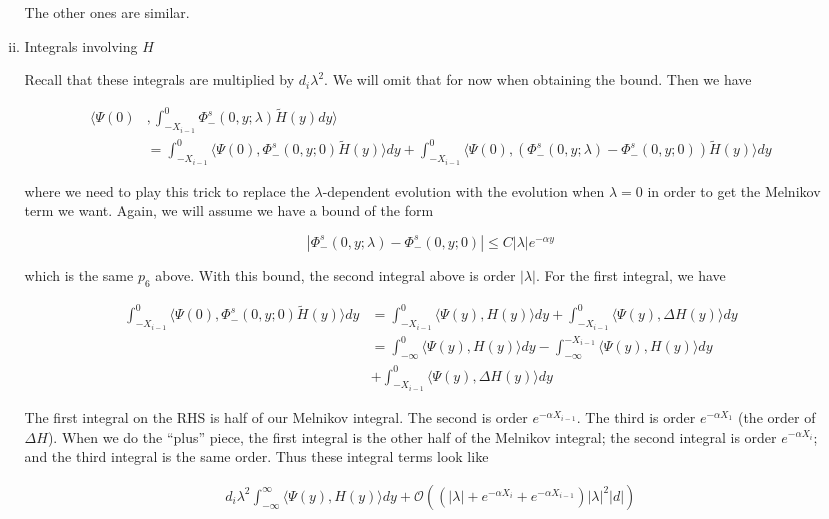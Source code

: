 \documentclass[12pt]{article}
\begin{document}
\begin{enumerate}
\begin{enumerate}[(i)]
The other ones are similar.

\item Integrals involving $H$

Recall that these integrals are multiplied by $d_i \lambda^2$. We will omit that for now when obtaining the bound. Then we have

\begin{align*}
\langle \Psi(0)&, \int_{-X_{i-1}}^0 \Phi^s_-(0, y; \lambda) \tilde{H}(y) dy \rangle \\ 
&= \int_{-X_{i-1}}^0 \langle \Psi(0), \Phi^s_-(0, y; 0) \tilde{H}(y) \rangle dy + 
\int_{-X_{i-1}}^0 \langle \Psi(0), (\Phi^s_-(0, y; \lambda) - \Phi^s_-(0, y; 0)) \tilde{H}(y) \rangle dy
\end{align*}

where we need to play this trick to replace the $\lambda$-dependent evolution with the evolution when $\lambda = 0$ in order to get the Melnikov term we want. Again, we will assume we have a bound of the form

\[
|\Phi^s_-(0, y; \lambda) - \Phi^s_-(0, y; 0)| \leq C |\lambda| e^{-\alpha y}
\]

which is the same $p_6$ above. With this bound, the second integral above is order $|\lambda|$. For the first integral, we have 

\begin{align*}
\int_{-X_{i-1}}^0 \langle \Psi(0), \Phi^s_-(0, y; 0) \tilde{H}(y) \rangle dy &= 
\int_{-X_{i-1}}^0 \langle \Psi(y), H(y) \rangle dy + \int_{-X_{i-1}}^0 \langle \Psi(y), \Delta H(y) \rangle dy \\
&= \int_{-\infty}^0 \langle \Psi(y), H(y) \rangle dy - \int_{-\infty}^{-X_{i-1}} \langle \Psi(y), H(y) \rangle dy \\
&+ \int_{-X_{i-1}}^0 \langle \Psi(y), \Delta H(y) \rangle dy 
\end{align*}

The first integral on the RHS is half of our Melnikov integral. The second is order $e^{-\alpha X_{i-1}}$. The third is order $e^{-\alpha X_1}$ (the order of $\Delta H$). When we do the ``plus'' piece, the first integral is the other half of the Melnikov integral; the second integral is order $e^{-\alpha X_i}$; and the third integral is the same order. Thus these integral terms look like

\begin{align*}
d_i \lambda^2 \int_{-\infty}^\infty \langle \Psi(y), H(y) \rangle dy + \mathcal{O}( ( |\lambda| + e^{-\alpha X_i} + e^{-\alpha X_{i-1}} ) |\lambda|^2 |d|)
\end{align*}


\end{enumerate}
\end{enumerate}
\end{document}
